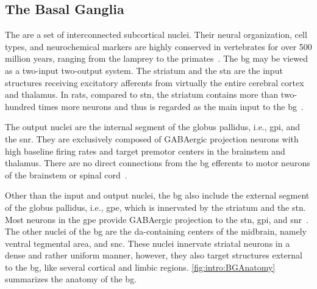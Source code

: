\subsection{The Basal Ganglia}
\label{intro:BGAnatomy}
The  are a set of interconnected subcortical nuclei.
Their neural organization, cell types, and neurochemical markers are highly conserved in vertebrates for over 500 million years, ranging from the lamprey to the primates~\cite{Grillner2016BG}.
The \gls{bg} may be viewed as a two-input two-output system.
The striatum and the \gls{stn} are the input structures receiving excitatory afferents from virtually the entire cerebral cortex and thalamus.
In rats, compared to \gls{stn}, the striatum contains more than two-hundred times more neurons and thus is regarded as the main input to the \gls{bg}~\cite{Oorschot1996}.
\par
The output nuclei are the internal segment of the globus pallidus, i.e., \gls{gpi}, and the \gls{snr}.
They are exclusively composed of GABAergic projection neurons with high baseline firing rates and target premotor centers in the brainstem and thalamus.
There are no direct connections from the \gls{bg} efferents to motor neurons of the brainstem or spinal cord~\cite{Mink1996}.
\par
Other than the input and output nuclei, the \gls{bg} also include the external segment of the globus pallidus, i.e., \gls{gpe}, which is innervated by the striatum and the \gls{stn}.
Most neurons in the \gls{gpe} provide GABAergic projection to the \gls{stn}, \gls{gpi}, and \gls{snr}~\cite{Dudman2015Book}.
The other nuclei of the \gls{bg} are the \gls{da}-containing centers of the midbrain, namely ventral tegmental area, and \gls{snc}.
These nuclei innervate striatal neurons in a dense and rather uniform manner, however, they also target structures external to the \gls{bg}, like several cortical and limbic regions.
\autoref{fig:intro:BGAnatomy} summarizes the anatomy of the \gls{bg}.


